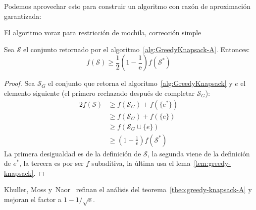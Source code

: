   Podemos aprovechar esto
  para construir un algoritmo con razón de aproximación garantizada:
  \begin{algorithm}[htbp]
    \DontPrintSemicolon\Indp

    \caption{El algoritmo voraz para restricción de mochila,
             corrección simple}
    \label{alg:GreedyKnapsack-A}
  \end{algorithm}
  \begin{theorem}
    \label{theo:greedy-knapsack-A}
    Sea \(\mathscr{S}\) el conjunto
    retornado por el algoritmo~\ref{alg:GreedyKnapsack-A}.
    Entonces:
    \begin{equation*}
      f(\mathscr{S})
        \ge \frac{1}{2} \left(1 - \frac{1}{\mathrm{e}}\right) f(\mathscr{S}^*)
    \end{equation*}
  \end{theorem}
  \begin{proof}
    Sea \(\mathscr{S}_G\) el conjunto
    que retorna el algoritmo~\ref{alg:GreedyKnapsack}
    y \(e\) el elemento siguiente
    (el primero rechazado después de completar \(\mathscr{S}_G\)):
    \begin{align*}
      2 f(\mathscr{S})
        &\ge f(\mathscr{S}_G) + f(\{e^*\}) \\
        &\ge f(\mathscr{S}_G) + f(\{e\}) \\
        &\ge f(\mathscr{S}_G \cup \{e\}) \\
        &\ge \left(
               1 - \frac{1}{\mathrm{e}}
             \right) f(\mathscr{S}^*)
    \end{align*}
    La primera desigualdad es de la definición de \(\mathscr{S}\),
    la segunda viene de la definición de \(e^*\),
    la tercera es por ser \(f\) subaditiva,
    la última usa el lema~\ref{lem:greedy-knapsack}.
  \end{proof}
  Khuller, Moss y~Naor~%
    \cite{khuller99:_budget_max_cover_problem}
  refinan el análisis del teorema~\ref{theo:greedy-knapsack-A}
  y mejoran el factor a \(1 - 1 / \sqrt{\mathrm{e}}\).

